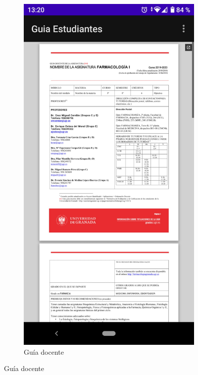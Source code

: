 \documentclass[a4paper,11pt]{article}
\begin{document}
\begin{figure}[H]
\begin{subfigure}{0.5\textwidth}
  \label{fig:sub-first}
\end{subfigure}
\begin{subfigure}{0.5\textwidth}
  \centering
  \includegraphics[width=1\linewidth]{imagenes/guiadocente.jpeg}  
  \caption{Guía docente}
  \label{fig:sub-second}
\end{subfigure}
\end{figure}
\end{document}
